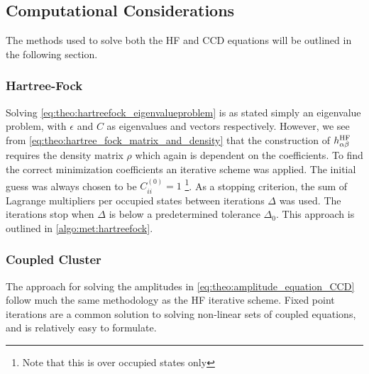 \subsection{Computational Considerations}
The methods used to solve both the HF and CCD equations will be outlined in the following section. 

\subsubsection{Hartree-Fock}
Solving \cref{eq:theo:hartreefock_eigenvalueproblem} is as stated simply an eigenvalue problem, with $\epsilon$ and $C$ as eigenvalues and vectors respectively. However, we see from \cref{eq:theo:hartree_fock_matrix_and_density} that the construction of $h^{\text{HF}}_{\alpha\beta}$ requires the density matrix $\rho$ which again is dependent on the coefficients. To find the correct minimization coefficients an iterative scheme was applied. The initial guess was always chosen to be $C^{(0)}_{ii} = 1$ \footnote{Note that this is over occupied states only}. As a stopping criterion, the sum of Lagrange multipliers per occupied states between iterations $\Delta$ was used. The iterations stop when $\Delta$ is below a predetermined tolerance $\Delta_0$. This approach is outlined in \cref{algo:met:hartreefock}.



\subsubsection{Coupled Cluster}
The approach for solving the amplitudes in \cref{eq:theo:amplitude_equation_CCD} follow much the same methodology as the HF iterative scheme. Fixed point iterations are a common solution to solving non-linear sets of coupled equations, and is relatively easy to formulate.

